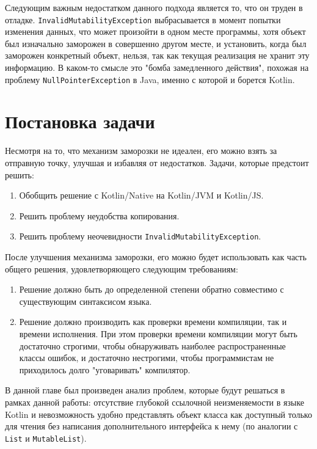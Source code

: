 \documentclass[specification,annotation,times]{itmo-student-thesis}
\begin{document}
Следующим важным недостатком данного подхода является то, что он труден в отладке.
\texttt{InvalidMutabilityException} выбрасывается в момент попытки изменения данных, что может произойти в одном месте программы, хотя объект был изначально заморожен в совершенно другом месте, и установить, когда был заморожен конкретный объект, нельзя, так как текущая реализация не хранит эту информацию.
В каком-то смысле это "бомба замедленного действия", похожая на проблему \texttt{NullPointerException} в Java, именно с которой и борется Kotlin.

\section{Постановка задачи}

Несмотря на то, что механизм заморозки не идеален, его можно взять за отправную точку, улучшая и избавляя от недостатков. Задачи, которые предстоит решить:

\begin{enumerate}
	\item Обобщить решение с Kotlin/Native на Kotlin/JVM и Kotlin/JS.
	\item Решить проблему неудобства копирования.
	\item Решить проблему неочевидности \texttt{InvalidMutabilityException}.
\end{enumerate}

После улучшения механизма заморозки, его можно будет использовать как часть общего решения, удовлетворяющего следующим требованиям:

\begin{enumerate}
	\item Решение должно быть до определенной степени обратно совместимо с существующим синтаксисом языка.
	\item Решение должно производить как проверки времени компиляции, так и времени исполнения. При этом проверки времени компиляции могут быть достаточно строгими, чтобы обнаруживать наиболее распространенные классы ошибок, и достаточно нестрогими, чтобы программистам не приходилось долго "уговаривать" компилятор.
\end{enumerate}


\finishrelatedwork

\chapterconclusion

В данной главе был произведен анализ проблем, которые будут решаться в рамках данной работы: отсутствие глубокой ссылочной неизменяемости в языке Kotlin и невозможность удобно представлять объект класса как доступный только для чтения без написания дополнительного интерфейса к нему (по аналогии с \texttt{List} и \texttt{MutableList}).
\end{document}
